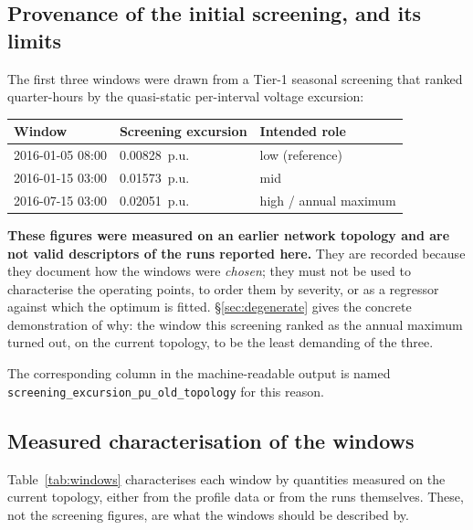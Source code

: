 \documentclass[11pt,a4paper]{article}
\newcommand{\pu}{\ensuremath{\mathrm{p.u.}}}
\begin{document}
\subsection{Provenance of the initial screening, and its limits}
\label{sec:screening}

The first three windows were drawn from a Tier-1 seasonal screening that ranked
quarter-hours by the quasi-static per-interval voltage excursion:

\begin{center}
\begin{tabular}{lll}
\toprule
Window & Screening excursion & Intended role \\
\midrule
2016-01-05 08:00 & \SI{0.00828}{\pu} & low (reference) \\
2016-01-15 03:00 & \SI{0.01573}{\pu} & mid \\
2016-07-15 03:00 & \SI{0.02051}{\pu} & high / annual maximum \\
\bottomrule
\end{tabular}
\end{center}

\textbf{These figures were measured on an earlier network topology and are not
valid descriptors of the runs reported here.} They are recorded because they
document how the windows were \emph{chosen}; they must not be used to
characterise the operating points, to order them by severity, or as a regressor
against which the optimum is fitted. \S\ref{sec:degenerate} gives the concrete
demonstration of why: the window this screening ranked as the annual maximum
turned out, on the current topology, to be the least demanding of the three.

The corresponding column in the machine-readable output is named
\texttt{screening\_excursion\_pu\_old\_topology} for this reason.

\subsection{Measured characterisation of the windows}

Table~\ref{tab:windows} characterises each window by quantities measured on the
current topology, either from the profile data or from the runs themselves.
These, not the screening figures, are what the windows should be described by.
\end{document}
